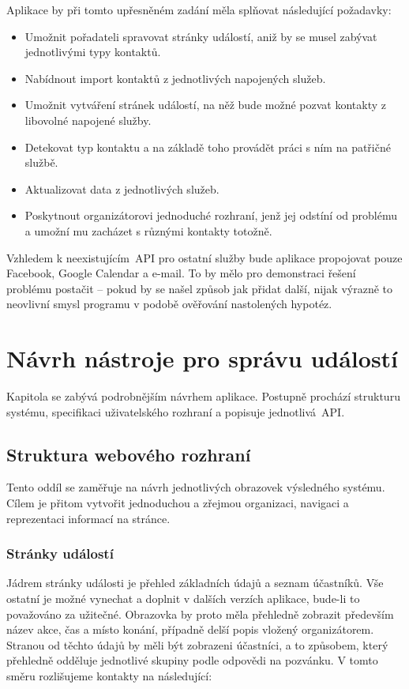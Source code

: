 \documentclass[12pt,oneside,final]{fithesis2}
\begin{document}
Aplikace by při tomto upřesněném zadání měla splňovat následující požadavky:

\begin{itemize}
    \item Umožnit pořadateli spravovat stránky událostí, aniž by se musel zabývat jednotlivými typy kontaktů.
    \item Nabídnout import kontaktů z jednotlivých napojených služeb.
    \item Umožnit vytváření stránek událostí, na něž bude možné pozvat kontakty z libovolné napojené služby.
    \item Detekovat typ kontaktu a na základě toho provádět práci s ním na patřičné službě.
    \item Aktualizovat data z jednotlivých služeb.
    \item Poskytnout organizátorovi jednoduché rozhraní, jenž jej odstíní od problému a umožní mu zacházet s různými kontakty totožně.
\end{itemize}

Vzhledem k neexistujícím~API pro ostatní služby bude aplikace propojovat pouze Facebook, Google Calendar a e-mail. To by mělo pro demonstraci řešení problému postačit -- pokud by se našel způsob jak přidat další, nijak výrazně to neovlivní smysl programu v podobě ověřování nastolených hypotéz.



\chapter{Návrh nástroje pro správu událostí}
Kapitola se zabývá podrobnějším návrhem aplikace. Postupně prochází strukturu systému, specifikaci uživatelského rozhraní a popisuje jednotlivá~API.

\section{Struktura webového rozhraní}
Tento oddíl se zaměřuje na návrh jednotlivých obrazovek výsledného systému. Cílem je přitom vytvořit jednoduchou a zřejmou organizaci, navigaci a reprezentaci informací na stránce.

\subsection{Stránky událostí}
Jádrem stránky události je přehled základních údajů a seznam účastníků. Vše ostatní je možné vynechat a doplnit v dalších verzích aplikace, bude-li to považováno za užitečné. Obrazovka by proto měla přehledně zobrazit především název akce, čas a místo konání, případně delší popis vložený organizátorem. Stranou od těchto údajů by měli být zobrazeni účastníci, a to způsobem, který přehledně odděluje jednotlivé skupiny podle odpovědi na pozvánku. V tomto směru rozlišujeme kontakty na následující:
\end{document}
